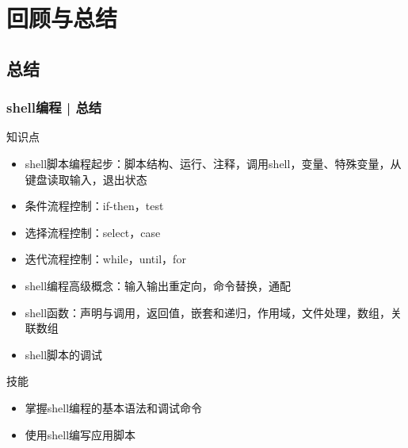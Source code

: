 \section{回顾与总结}
\subsection{总结}
\begin{frame}
  \frametitle{shell编程 | 总结}
  \begin{block}{知识点}
    \begin{itemize}
      \item shell脚本编程起步：脚本结构、运行、注释，调用shell，变量、特殊变量，从键盘读取输入，退出状态
      \item 条件流程控制：if-then，test
      \item 选择流程控制：select，case
      \item 迭代流程控制：while，until，for
      \item shell编程高级概念：输入输出重定向，命令替换，通配
      \item shell函数：声明与调用，返回值，嵌套和递归，作用域，文件处理，数组，关联数组
      \item shell脚本的调试
    \end{itemize}
  \end{block}
  \begin{block}{技能}
    \begin{itemize}
      \item 掌握shell编程的基本语法和调试命令
      \item 使用shell编写应用脚本
    \end{itemize}
  \end{block}
\end{frame}

